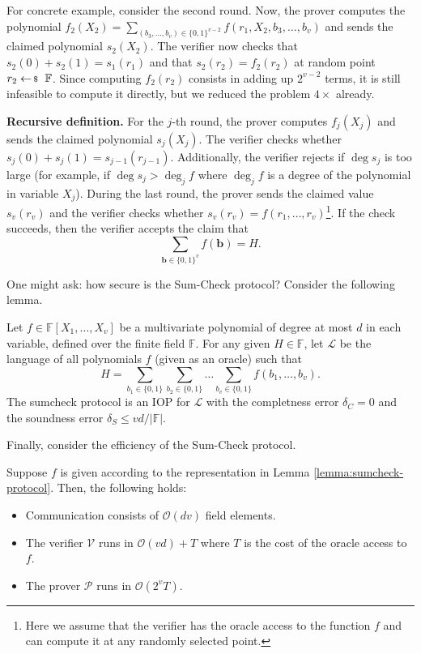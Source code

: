 For concrete example, consider the second round. Now, the prover computes the
polynomial $f_2(X_2) = \sum_{(b_3,\dots,b_v) \in \{0,1\}^{v-2}}
f(r_1,X_2,b_3,\dots,b_v)$ and sends the claimed polynomial $s_2(X_2)$. The
verifier now checks that $s_2(0) + s_2(1) = s_1(r_1)$ and that $s_2(r_2) =
f_2(r_2)$ at random point $r_2 \leftarrowS \mathbb{F}$. Since computing
$f_2(r_2)$ consists in adding up $2^{v-2}$ terms, it is still infeasible to
compute it directly, but we reduced the problem $4 \times$ already.

\textbf{Recursive definition.} For the $j$-th round, the prover computes
$f_j(X_j)$ and sends the claimed polynomial $s_j(X_j)$. The verifier checks
whether $s_j(0) + s_j(1) = s_{j-1}(r_{j-1})$. Additionally, the verifier rejects
if $\deg s_j$ is too large (for example, if $\deg s_j > \deg_j f$ where $\deg_j
f$ is a degree of the polynomial in variable $X_j$). During the last round, the
prover sends the claimed value $s_v(r_v)$ and the verifier checks whether
$s_v(r_v) = f(r_1,\dots,r_v)$\footnote{Here we assume that the verifier has the
oracle access to the function $f$ and can compute it at any randomly selected
point.}. If the check succeeds, then the verifier accepts the claim that
\begin{equation*}
    \sum_{\boldsymbol{b} \in \{0,1\}^v} f(\boldsymbol{b}) = H.
\end{equation*}

One might ask: how secure is the Sum-Check protocol? Consider the following 
lemma.
\begin{lemma}\label{lemma:sumcheck-protocol}
    Let $f \in \mathbb{F}[X_1,\dots,X_v]$ be a multivariate polynomial of degree
    at most $d$ in each variable, defined over the finite field $\mathbb{F}$.
    For any given $H \in \mathbb{F}$, let $\mathcal{L}$ be the language of 
    all polynomials $f$ (given as an oracle) such that
    \begin{equation*}
        H = \sum_{b_1 \in \{0,1\}}\sum_{b_2 \in \{0,1\}} \dots \sum_{b_v \in \{0,1\}} f(b_1,\dots,b_v).
    \end{equation*}
    The sumcheck protocol is an IOP for $\mathcal{L}$ with the completness error
    $\delta_C=0$ and the soundness error $\delta_S \leq vd/|\mathbb{F}|$.
\end{lemma}

Finally, consider the efficiency of the Sum-Check protocol.
\begin{lemma}
    Suppose $f$ is given according to the representation in Lemma \ref{lemma:sumcheck-protocol}. Then, the 
    following holds:
    \begin{itemize}
        \item Communication consists of $\mathcal{O}(dv)$ field elements.
        \item The verifier $\mathcal{V}$ runs in $\mathcal{O}(vd)+T$ where $T$
        is the cost of the oracle access to $f$.
        \item The prover $\mathcal{P}$ runs in $\mathcal{O}(2^vT)$.
    \end{itemize}
\end{lemma}

